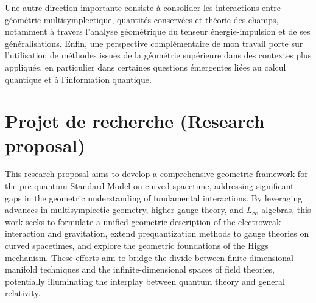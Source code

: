 \documentclass[a4paper]{article}
\begin{document}
Une autre direction importante consiste à consolider les interactions entre géométrie multisymplectique, quantités conservées et théorie des champs, notamment à travers l’analyse géométrique du tenseur énergie-impulsion et de ses généralisations. Enfin, une perspective complémentaire de mon travail porte sur l’utilisation de méthodes issues de la géométrie supérieure dans des contextes plus appliqués, en particulier dans certaines questions émergentes liées au calcul quantique et à l’information quantique.



	\clearpage
	\section*{Projet de recherche (Research proposal)}



	\begin{abstract}
		This project proposes the development of a geometric framework for the pre-quantum Standard Model on curved spacetimes by integrating multisymplectic geometry, higher gauge theory, and $L_\infty$-algebras. The objective is to formulate a covariant, finite-dimensional model capturing the interplay between electroweak interactions and gravitation, extending prequantization techniques to gauge theories on generic backgrounds. Central to this effort is the construction of a Poincaré groupoid as a curved-spacetime generalization of the Poincaré group, formalizing translations as parallel transports and local Lorentz transformations via groupoid symmetries. This will enable the definition of multilocal observables within multisymplectic geometry, informed by Poisson algebra bundles, and clarify their algebraic and geometric structures. By systematically bridging finite- and infinite-dimensional formulations, the project aims to provide a rigorous geometric description of classical field theories, paving the way for a covariant quantization framework compatible with general relativity.
	\end{abstract}

	

This research proposal aims to develop a comprehensive geometric framework for the pre-quantum Standard Model on curved spacetime, addressing significant gaps in the geometric understanding of fundamental interactions. By leveraging advances in multisymplectic geometry, higher gauge theory, and $L_\infty$-algebras, this work seeks to formulate a unified geometric description of the electroweak interaction and gravitation, extend prequantization methods to gauge theories on curved spacetimes, and explore the geometric foundations of the Higgs mechanism. These efforts aim to bridge the divide between finite-dimensional manifold techniques and the infinite-dimensional spaces of field theories, potentially illuminating the interplay between quantum theory and general relativity.
\end{document}
